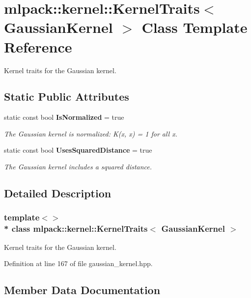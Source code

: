 \section{mlpack\+:\+:kernel\+:\+:Kernel\+Traits$<$ Gaussian\+Kernel $>$ Class Template Reference}
\label{classmlpack_1_1kernel_1_1KernelTraits_3_01GaussianKernel_01_4}


Kernel traits for the Gaussian kernel.  


\subsection*{Static Public Attributes}
\begin{DoxyCompactItemize}
\item 
static const bool {\bf Is\+Normalized} = true
\begin{DoxyCompactList}\small\item\em The Gaussian kernel is normalized\+: K(x, x) = 1 for all x. \end{DoxyCompactList}\item 
static const bool {\bf Uses\+Squared\+Distance} = true
\begin{DoxyCompactList}\small\item\em The Gaussian kernel includes a squared distance. \end{DoxyCompactList}\end{DoxyCompactItemize}


\subsection{Detailed Description}
\subsubsection*{template$<$$>$\\*
class mlpack\+::kernel\+::\+Kernel\+Traits$<$ Gaussian\+Kernel $>$}

Kernel traits for the Gaussian kernel. 

Definition at line 167 of file gaussian\+\_\+kernel.\+hpp.



\subsection{Member Data Documentation}
